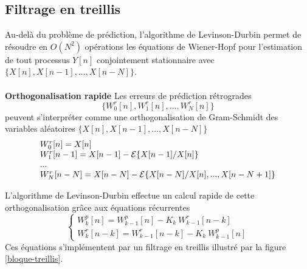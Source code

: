 \subsection{Filtrage en treillis}

Au-del\`a du probl\`eme de pr\'ediction, l'algorithme de
Levinson-Durbin permet de r\'esoudre en $O(N^2)$ op\'erations les
\'equations de Wiener-Hopf pour l'estimation de tout
processus $Y[n]$ conjointement stationnaire avec
$\{X [n] , X[n-1] , ..., X[n-N] \}$.
\\
\\
{\bf Orthogonalisation rapide}
Les erreurs de pr\'ediction r\'etrogrades 
\[
\{W^r_0 [n] , W^r_1 [n] , ..., W^r_N [n] \}
\]
peuvent s'interpr\'eter comme
une orthogonalisation de Gram-Schmidt des
variables al\'eatoires
$\{X [n] , X[n-1] , ..., X[n-N] \}$
\[
\begin{array}{l}
W^r_0 [n] = X[n] \\
W^r_1 [n-1] = X[n-1] - {\cal E} \{ X[n-1] {/} X[n] \} \\
...\\
W^r_N [n-N] = 
X[n-N] - {\cal E} \{ X[n-N] {/} X[n],..., X[n-N+1] \} \\
\end{array}
\]

L'algorithme de Levinson-Durbin effectue un calcul rapide
de cette orthogonalisation gr\^ace aux \'equations r\'ecurrentes
\begin{equation}
\label{erreur-rec2}
\left\{ \begin{array}{l}
W_k^p [n] = W_{k-1}^p [n] - 
K_k ~W^r_{k-1} [n-k] \\
W_k^r [n-k] = W_{k-1}^r [n-k] - 
K_k ~W^p_{k-1} [n] 
\end{array}
\right.
\end{equation}
Ces \'equations s'impl\'ementent 
par un filtrage en treillis illustr\'e
par la figure \ref{bloque-treillis}.

